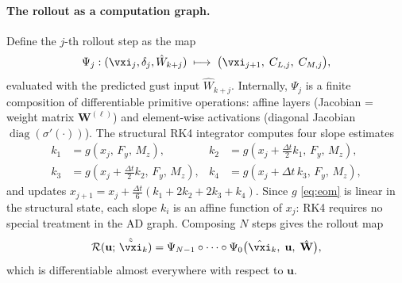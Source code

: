 \paragraph{The rollout as a computation graph.}
Define the $j$-th rollout step as the map
\begin{equation}
  \Psi_j : (\vxi_j, \delta_j, \hat{W}_{k+j}) \;\longmapsto\;
  \bigl(\vxi_{j+1},\; C_{L,j},\; C_{M,j}\bigr),
  \label{eq:Psi_j}
\end{equation}
evaluated with the predicted gust input $\hat{W}_{k+j}$.
Internally, $\Psi_j$ is a finite composition of differentiable primitive
operations: affine layers (Jacobian = weight matrix $\mathbf{W}^{(\ell)}$) and
element-wise activations (diagonal Jacobian $\operatorname{diag}(\sigma'(\cdot))$).
The structural RK4 integrator computes four slope estimates
\begin{equation}
  \begin{aligned}
    k_1 &= g(x_j,\, F_y,\, M_z), & k_2 &= g\!\left(x_j + \tfrac{\Delta t}{2}k_1,\, F_y,\, M_z\right), \\
    k_3 &= g\!\left(x_j + \tfrac{\Delta t}{2}k_2,\, F_y,\, M_z\right), & k_4 &= g(x_j + \Delta t\,k_3,\, F_y,\, M_z),
  \end{aligned}
  \label{eq:rk4_slopes}
\end{equation}
and updates $x_{j+1} = x_j + \tfrac{\Delta t}{6}(k_1 + 2k_2 + 2k_3 + k_4)$.
Since $g$ \eqref{eq:eom} is linear in the structural state, each slope $k_i$
is an affine function of $x_j$: RK4 requires no special treatment in the AD
graph.
Composing $N$ steps gives the rollout map
\begin{equation}
  \mathcal{R}(\mathbf{u};\,\hat{\tilde{\vxi}}_k)
  = \Psi_{N-1} \circ \cdots \circ \Psi_0
  \bigl(\hat{\vxi}_k,\; \mathbf{u},\; \hat{\mathbf{W}}\bigr),
  \label{eq:rollout}
\end{equation}
which is differentiable almost everywhere with respect to $\mathbf{u}$.

